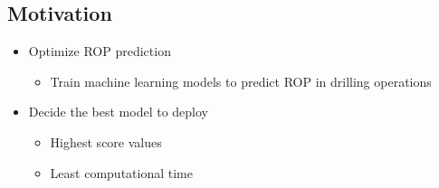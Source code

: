 \vspace{-.85cm}
\begin{center}
    \vspace{.05cm}
    \section*{Motivation}
\end{center}
\vspace{-.35cm}
\begin{itemize}
    \item {\large Optimize ROP prediction}
    \begin{itemize}
        \item {\large Train machine learning models to predict ROP in drilling operations}  
    \end{itemize}
    \item {\large Decide the best model to deploy}
    \vspace{-.2cm}
    \begin{multicols}{2}
    \begin{itemize}
        \item {\large Highest score values}
        \item {\large Least computational time}
    \end{itemize}
    \end{multicols}
\end{itemize}
\vspace{-.85cm}